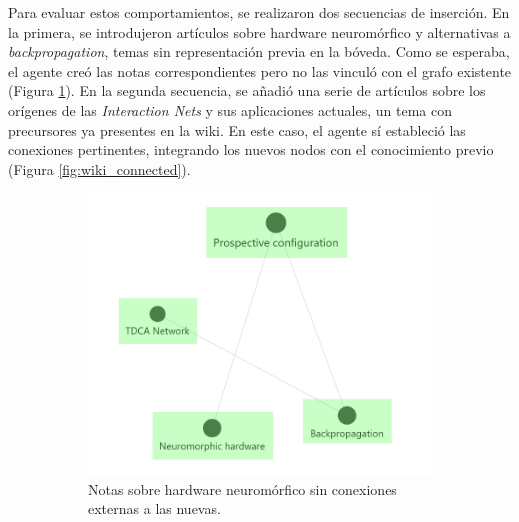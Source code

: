 Para evaluar estos comportamientos, se realizaron dos secuencias de inserción. En la primera, se introdujeron artículos sobre hardware neuromórfico y alternativas a \textit{backpropagation}, temas sin representación previa en la bóveda. Como se esperaba, el agente creó las notas correspondientes pero no las vinculó con el grafo existente (Figura \ref{fig:wiki_isolated}). En la segunda secuencia, se añadió una serie de artículos sobre los orígenes de las \textit{Interaction Nets} y sus aplicaciones actuales, un tema con precursores ya presentes en la wiki. En este caso, el agente sí estableció las conexiones pertinentes, integrando los nuevos nodos con el conocimiento previo (Figura \ref{fig:wiki_connected}).

\begin{figure}[h!]
    \centering
    \begin{subfigure}[b]{0.48\textwidth}
        \centering
        \includegraphics[width=\textwidth]{figures/neuromPart.png}
        \caption{Notas sobre hardware neuromórfico sin conexiones externas a las nuevas.}
        \label{fig:wiki_isolated}
    \end{subfigure}
    \hfill
    \begin{subfigure}[b]{0.5\textwidth}
        \centering

\end{subfigure}
\end{figure}
